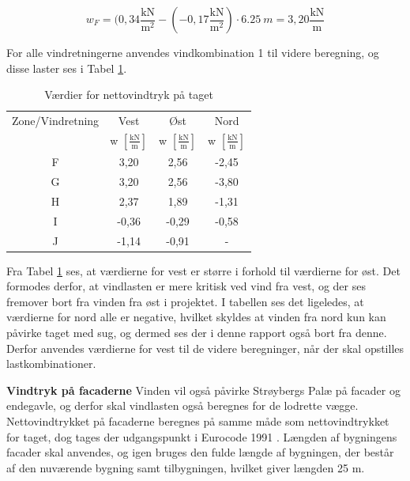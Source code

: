 \begin{equation} 
	w_F = (0,\!34 \frac{\text{kN}}{\text{m}^2} - (-0,\!17 \frac{\text{kN}}{\text{m}^2})\cdot \SI{6,25}{m} = 3,\!20 \frac{\text{kN}}{\text{m}}
\end{equation}

For alle vindretningerne anvendes vindkombination 1 til videre beregning, og disse laster ses i Tabel \ref{tab:bb}. 

\begin{table}[htb]
	\begin{center}
		\begin{tabular}{ c c c c } 
			\hline
			Zone/Vindretning & Vest & Øst & Nord \\
			& w $[\frac{\text{kN}}{\text{m}}]$ & w $[\frac{\text{kN}}{\text{m}}]$ & w $[\frac{\text{kN}}{\text{m}}]$ \\ \hline
			F & 3,20 & 2,56 & -2,45 \\
			G & 3,20 & 2,56 & -3,80 \\	
			H & 2,37 & 1,89 & -1,31 \\ 	
			I & -0,36 & -0,29 & -0,58 \\
			J & -1,14 & -0,91 & - \\
		\end{tabular}
		\caption{Værdier for nettovindtryk på taget}
		\label{tab:bb}
	\end{center}
\end{table}

Fra Tabel \ref{tab:bb} ses, at værdierne for vest er større i forhold til værdierne for øst. Det formodes derfor, at vindlasten er mere kritisk ved vind fra vest, og der ses fremover bort fra vinden fra øst i projektet. I tabellen ses det ligeledes, at værdierne for nord alle er negative, hvilket skyldes at vinden fra nord kun kan påvirke taget med sug, og dermed ses der i denne rapport også bort fra denne. 
\newline \indent{     }  Derfor anvendes værdierne for vest til de videre beregninger, når der skal opstilles lastkombinationer.


\textbf{Vindtryk på facaderne}
\newline
Vinden vil også påvirke Strøybergs Palæ på facader og endegavle, og derfor skal vindlasten også beregnes for de lodrette vægge.
\newline \indent{     }  Nettovindtrykket på facaderne beregnes på samme måde som nettovindtrykket for taget, dog tages der udgangspunkt i Eurocode 1991 \citep[ tabel 7.1]{EU91}. Længden af bygningens facader skal anvendes, og igen bruges den fulde længde af bygningen, der består af den nuværende bygning samt tilbygningen, hvilket giver længden 25 m. 


